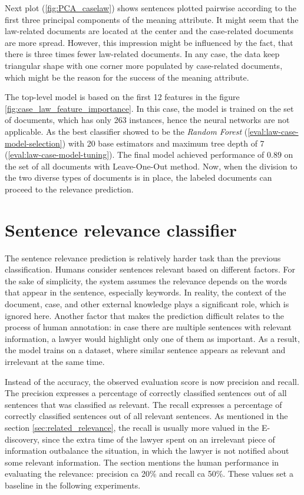 \documentclass[
  digital, %
  notable,   %
  nolof,     %
  nolot,     %
  draft
]{fithesis3}
\begin{document}
Next plot (\ref{fig:PCA_caselaw}) shows sentences plotted pairwise according to the first three principal components of the meaning attribute.
It might seem that the law-related documents are located at the center and the case-related documents are more spread.
However, this impression might be influenced by the fact, that there is three times fewer law-related documents.
In any case, the data keep triangular shape with one corner more populated by case-related documents, which might be the reason for the success of the meaning attribute.


The top-level model is based on the first 12 features in the figure \ref{fig:case_law_feature_importance}.
In this case, the model is trained on the set of documents, which has only 263 instances, hence the neural networks are not applicable.
As the best classifier showed to be the \textit{Random Forest} (\ref{eval:law-case-model-selection}) with 20 base estimators and maximum tree depth of 7 (\ref{eval:law-case-model-tuning}). The final model achieved performance of $0.89$ on the set of all documents with Leave-One-Out method. Now, when the division to the two diverse types of documents is in place, the labeled documents can proceed to the relevance prediction.

\section{Sentence relevance classifier}
\label{sec:sentence-classifier}
The sentence relevance prediction is relatively harder task than the previous classification.
Humans consider sentences relevant based on different factors.
For the sake of simplicity, the system assumes the relevance depends on the words that appear in the sentence, especially keywords.
In reality, the context of the document, case, and other external knowledge plays a significant role, which is ignored here.
Another factor that makes the prediction difficult relates to the process of human annotation: in case there are multiple sentences with relevant information, a lawyer would highlight only one of them as important.
As a result, the model trains on a dataset, where similar sentence appears as relevant and irrelevant at the same time.

Instead of the accuracy, the observed evaluation score is now precision and recall.
The precision expresses a percentage of correctly classified sentences out of all sentences that was classified as relevant.
The recall expresses a percentage of correctly classified sentences out of all relevant sentences.
As mentioned in the section \ref{sec:related_relevance}, the recall is usually more valued in the E-discovery, since the extra time of the lawyer spent on an irrelevant piece of information outbalance the situation, in which the lawyer is not notified about some relevant information.
The section mentions the human performance in evaluating the relevance: precision ca 20\% and recall ca 50\%.
These values set a baseline in the following experiments.
\end{document}
